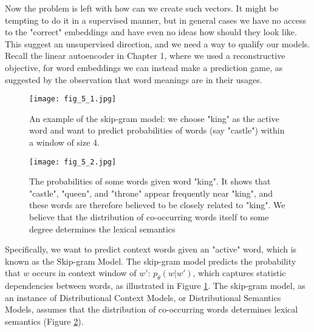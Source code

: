 \documentclass[../book-template.tex]{subfiles}
\begin{document}
\par Now the problem is left with how can we create such vectors. It might be tempting to do it in a supervised manner, but in general cases we have no access to the "correct" embeddings and have even no ideas how should they look like. This suggest an unsupervised direction, and we need a way to qualify our models. Recall the linear autoencoder in Chapter 1, where we used a reconstructive objective, for word embeddings we can instead make a prediction game, as suggested by the observation that word meanings are in their usages. 
\begin{figure}[h] 
	\centering 
	\texttt{[image: fig\_5\_1.jpg]} 
	\caption{An example of the skip-gram model: we choose "king" as the active word and want to predict probabilities of words (say "castle") within a window of size 4.}\label{fig_5_1}
\end{figure}
\begin{figure}[h] 
	\centering 
	\texttt{[image: fig\_5\_2.jpg]} 
	\caption{The probabilities of some words given word "king". It shows that "castle", "queen", and "throne" appear frequently near "king", and these words are therefore believed to be closely related to "king". We believe that the distribution of co-occurring words itself to some degree determines the lexical semantics}\label{fig_5_2}
\end{figure}
\par Specifically, we want to predict context words given an "active" word, which is known as the Skip-gram Model. The skip-gram model predicts the probability that $w$ occurs in context window of $w'$: $p_{\theta}(w|w')$, which captures statistic dependencies between words, as illustrated in Figure \ref{fig_5_1}. The skip-gram model, as an instance of Distributional Context Models, or Distributional Semantics Models, assumes that the distribution of co-occurring words determines lexical semantics (Figure \ref{fig_5_2}).
\end{document}
